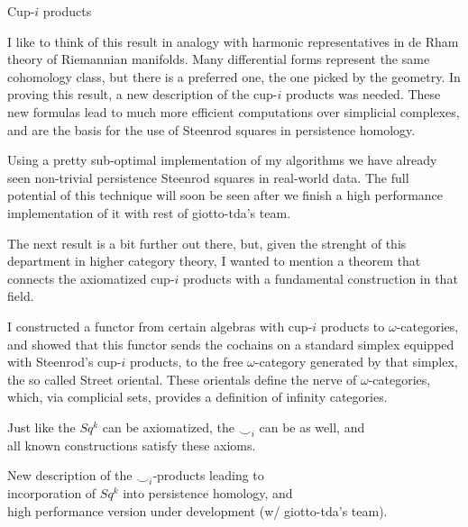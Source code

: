 {\begin{frame}[c]{Cup-$i$ products}
{			I like to think of this result in analogy with harmonic representatives in de Rham theory of Riemannian manifolds. Many differential forms represent the same cohomology class, but there is a preferred one, the one picked by the geometry. \press
			\vk
			In proving this result, a new description of the cup-$i$ products was needed.
			These new formulas lead to much more efficient computations over simplicial complexes, and are the basis for the use of Steenrod squares in persistence homology.

			Using a pretty sub-optimal implementation of my algorithms we have already seen non-trivial persistence Steenrod squares in real-world data. The full potential of this technique will soon be seen after we finish a high performance implementation of it with rest of giotto-tda's team.
			\vk

			The next result is a bit further out there, but, given the strenght of this department in higher category theory, I wanted to mention a theorem that connects the axiomatized cup-$i$ products with a fundamental construction in that field. \press

			I constructed a functor from certain algebras with cup-$i$ products to $\omega$-categories, and showed that this functor sends the cochains on a standard simplex equipped with Steenrod's cup-$i$ products, to the free $\omega$-category generated by that simplex, the so called Street oriental. These orientals define the nerve of $\omega$-categories, which, via complicial sets, provides a definition of infinity categories.\\}

		\vskip -10pt
		\pause
		\begin{result}
			Just like the $Sq^k$ can be axiomatized, the $\smallsmile_i$ can be as well, and\\ all known constructions satisfy these axioms.
		\end{result}

		\pause
		\vskip 10pt

		\begin{result}[M-M]
			New description of the $\smallsmile_i$-products leading to \\
			incorporation of $Sq^k$ into persistence homology, and \\
			high performance version under development (w/ giotto-tda's team).
		\end{result}

		\pause
		\vskip 10pt


\end{frame}}

